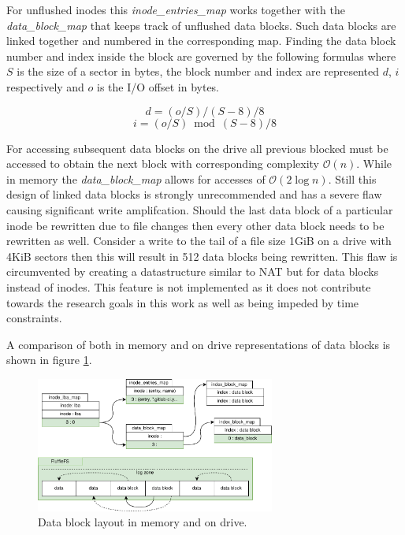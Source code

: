 For unflushed inodes this \textit{inode\_entries\_map} works together with the
\textit{data\_block\_map} that keeps track of unflushed data blocks. Such data
blocks are linked together and numbered in the corresponding map. Finding the
data block number and index inside the block are governed by the following
formulas where $S$ is the size of a sector in bytes, the block number and index
are represented $d$, $i$ respectively and $o$ is the I/O offset in bytes.

$$d = (o / S) / (S - 8) /8$$
$$i = (o / S) \bmod{(S - 8) /8}$$

For accessing subsequent data blocks on the drive all previous blocked must be
accessed to obtain the next block with corresponding complexity
$\mathcal{O}(n)$. While in memory the \textit{data\_block\_map} allows for
accesses of $\mathcal{O}(2 \log n)$. Still this design of linked data blocks is
strongly unrecommended and has a severe flaw causing significant write
amplifcation. Should the last data block of a particular inode be rewritten due
to file changes then every other data block needs to be rewritten as well.
Consider a write to the tail of a file size 1GiB on a drive with 4KiB sectors
then this will result in 512 data blocks being rewritten. This flaw is
circumvented by creating a datastructure similar to NAT but for data blocks
instead of inodes. This feature is not implemented as it does not contribute
towards the research goals in this work as well as being impeded by time
constraints.

A comparison of both in memory and on drive representations of data blocks
is shown in figure \ref{figure:fluffledatablock}.

\begin{figure}[h!]
    \centering
	\includegraphics[width=0.7\textwidth]{resources/images/fluffle-data-block.pdf}
	\caption{Data block layout in memory and on drive.}
    \label{figure:fluffledatablock}
\end{figure}

